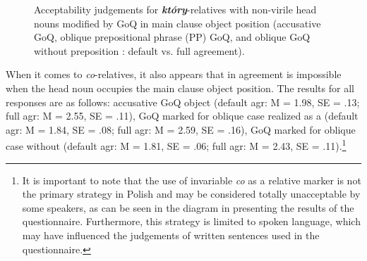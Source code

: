 \documentclass[output=paper]{langsci/langscibook}
\begin{document}
\begin{figure}
\caption{Acceptability judgements for \textbf{\textit{który}}{}-relatives with non-virile head nouns modified by GoQ in main clause object position (accusative GoQ, oblique prepositional phrase (PP) GoQ, and oblique GoQ without preposition : default vs. full agreement).}
\label{fig:leska:1}
\end{figure}

When it comes to \textit{co}{}-relatives, it also appears that  in agreement is impossible when the head noun occupies the main clause object position. The results for all responses are as follows: accusative GoQ object (default agr: M = 1.98, SE = .13; full agr: M = 2.55, SE = .11), GoQ marked for oblique case realized as a  (default agr: M = 1.84, SE = .08; full agr: M = 2.59, SE = .16), GoQ marked for oblique case without  (default agr: M = 1.81, SE = .06; full agr: M = 2.43, SE = .11).\footnote{It is important to note that the use of invariable \textit{co} as a relative marker is not the primary  strategy in Polish and may be considered totally unacceptable by some speakers, as can be seen in the diagram in  presenting the results of the questionnaire. Furthermore, this strategy is limited to spoken language, which may have influenced the judgements of written sentences used in the questionnaire.} 
\end{document}
